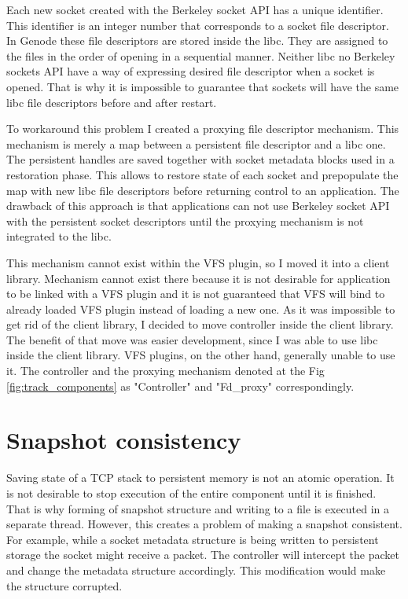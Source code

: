 Each new socket created with the Berkeley socket API has a unique identifier.
This identifier is an integer number that corresponds to a socket file
descriptor. In Genode these file descriptors are stored inside the libc. They
are assigned to the files in the order of opening in a sequential manner.
Neither libc no Berkeley sockets API have a way of expressing desired file
descriptor when a socket is opened. That is why it is impossible to guarantee
that sockets will have the same libc file descriptors before and after restart.

To workaround this problem I created a proxying file descriptor mechanism. This
mechanism is merely a map between a persistent file descriptor and a libc one.
The persistent handles are saved together with socket metadata blocks used in a
restoration phase. This allows to restore state of each socket and prepopulate
the map with new libc file descriptors before returning control to an
application. The drawback of this approach is that applications can not use
Berkeley socket API with the persistent socket descriptors until the proxying
mechanism is not integrated to the libc. 

This mechanism cannot exist within the VFS plugin, so I moved it into a client
library. Mechanism cannot exist there because it is not desirable for
application to be linked with a VFS plugin and it is not guaranteed that VFS
will bind to already loaded VFS plugin instead of loading a new one. As it was
impossible to get rid of the client library, I decided to move controller
inside the client library. The benefit of that move was easier development,
since I was able to use libc inside the client library. VFS plugins, on the
other hand, generally unable to use it. The controller and the proxying mechanism
denoted at the Fig \ref{fig:track_components} as "Controller" and "Fd\_proxy"
correspondingly.

\section{Snapshot consistency}

Saving state of a TCP stack to persistent memory is not an atomic operation. It
is not desirable to stop execution of the entire component until it is
finished. That is why forming of snapshot structure and writing to a file is
executed in a separate thread. However, this creates a problem of making a
snapshot consistent. For example, while a socket metadata structure is being
written to persistent storage the socket might receive a packet. The controller
will intercept the packet and change the metadata structure accordingly. This
modification would make the structure corrupted. 

